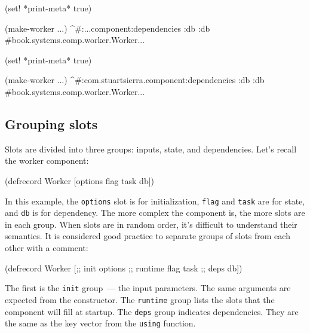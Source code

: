 \ifnarrow

\begin{english}
  \begin{clojure}
(set! *print-meta* true)

(make-worker {...})
^#:...component{:dependencies {:db :db}}
#book.systems.comp.worker.Worker{...}
  \end{clojure}
\end{english}

\else

\begin{english}
  \begin{clojure}
(set! *print-meta* true)

(make-worker {...})
^#:com.stuartsierra.component{:dependencies {:db :db}}
#book.systems.comp.worker.Worker{...}
  \end{clojure}
\end{english}

\fi

\subsection{Grouping slots}


Slots are divided into three groups: inputs, state, and dependencies. Let's recall the worker component:

\begin{english}
  \begin{clojure}
(defrecord Worker
    [options flag task db])
  \end{clojure}
\end{english}

In this example, the \verb|options| slot is for initialization, \verb|flag| and \verb|task| are for state, and \verb|db| is for dependency. The more complex the component is, the more slots are in each group. When slots are in random order, it's difficult to understand their semantics. It is considered good practice to separate groups of slots from each other with a comment:

\begin{english}
  \begin{clojure}
(defrecord Worker
    [;; init
     options
     ;; runtime
     flag
     task
     ;; deps
     db])
  \end{clojure}
\end{english}

The first is the \verb|init| group~--- the input parameters. The same arguments are expected from the constructor. The \verb|runtime| group lists the slots that the component will fill at startup. The \verb|deps| group indicates dependencies. They are the same as the key vector from the \verb|using| function.

